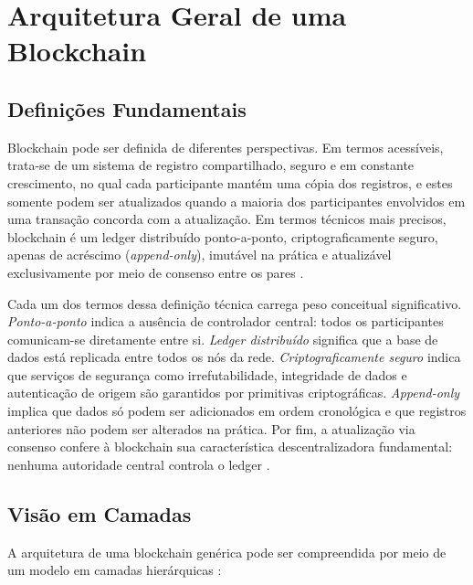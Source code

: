 \documentclass[12pt,a4paper]{report}
\begin{document}
\section{Arquitetura Geral de uma Blockchain}

\subsection{Definições Fundamentais}

Blockchain pode ser definida de diferentes perspectivas. Em termos acessíveis, trata-se de um sistema de registro compartilhado, seguro e em constante crescimento, no qual cada participante mantém uma cópia dos registros, e estes somente podem ser atualizados quando a maioria dos participantes envolvidos em uma transação concorda com a atualização. Em termos técnicos mais precisos, blockchain é um ledger distribuído ponto-a-ponto, criptograficamente seguro, apenas de acréscimo (\textit{append-only}), imutável na prática e atualizável exclusivamente por meio de consenso entre os pares \cite{Bashir2023}.

Cada um dos termos dessa definição técnica carrega peso conceitual significativo. \textit{Ponto-a-ponto} indica a ausência de controlador central: todos os participantes comunicam-se diretamente entre si. \textit{Ledger distribuído} significa que a base de dados está replicada entre todos os nós da rede. \textit{Criptograficamente seguro} indica que serviços de segurança como irrefutabilidade, integridade de dados e autenticação de origem são garantidos por primitivas criptográficas. \textit{Append-only} implica que dados só podem ser adicionados em ordem cronológica e que registros anteriores não podem ser alterados na prática. Por fim, a atualização via consenso confere à blockchain sua característica descentralizadora fundamental: nenhuma autoridade central controla o ledger \cite{Bashir2023}.

\subsection{Visão em Camadas}

A arquitetura de uma blockchain genérica pode ser compreendida por meio de um modelo em camadas hierárquicas \cite{Bashir2023}:
\end{document}
